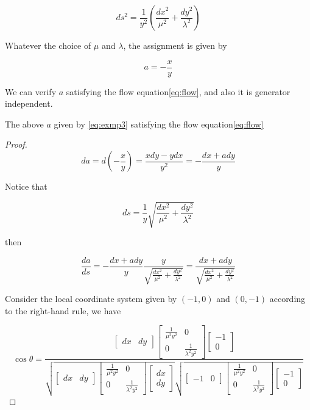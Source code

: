 $$
ds^2 = \frac{1}{y^2}(\frac{dx^2}{\mu^2} + \frac{dy^2}{\lambda^2})
$$

Whatever the choice of $\mu$ and $\lambda$, the assignment is given by

\begin{equation}\label{eq:exmp3}
a = - \frac{x}{y}
\end{equation}

We can verify $a$ satisfying the flow equation\eqref{eq:flow}, and also it is generator independent.

\begin{theorem}
The above $a$ given by \eqref{eq:exmp3} satisfying the flow equation\eqref{eq:flow}
\end{theorem}

\begin{proof}
$$
da = d(-\frac{x}{y}) = \frac{xdy - ydx}{y^2} = -\frac{dx + a dy}{y}
$$

Notice that

$$
ds = \frac{1}{y}\sqrt{\frac{dx^2}{\mu^2} + \frac{dy^2}{\lambda^2}}
$$

then

$$
\frac{da}{ds} = - \frac{dx + a dy}{y} \frac{y}{\sqrt{\frac{dx^2}{\mu^2} + \frac{dy^2}{\lambda^2}}} = \frac{dx + a dy}{\sqrt{\frac{dx^2}{\mu^2} + \frac{dy^2}{\lambda^2}}}
$$

Consider the local coordinate system given by $(-1, 0)$ and $(0, -1)$ according to the right-hand rule, we have

$$
\cos \theta = \frac{\begin{bmatrix} dx & dy \end{bmatrix} \begin{bmatrix} \frac{1}{\mu^2 y^2} & 0 \\ 0 & \frac{1}{\lambda^2 y^2} \end{bmatrix} \begin{bmatrix} -1 \\ 0 \end{bmatrix}}{\sqrt{\begin{bmatrix} dx & dy \end{bmatrix} \begin{bmatrix} \frac{1}{\mu^2 y^2} & 0 \\ 0 & \frac{1}{\lambda^2 y^2} \end{bmatrix} \begin{bmatrix} dx \\ dy \end{bmatrix}}\sqrt{\begin{bmatrix} -1 & 0 \end{bmatrix} \begin{bmatrix} \frac{1}{\mu^2 y^2} & 0 \\ 0 & \frac{1}{\lambda^2 y^2} \end{bmatrix} \begin{bmatrix} -1 \\ 0 \end{bmatrix}}}
$$


\end{proof}
